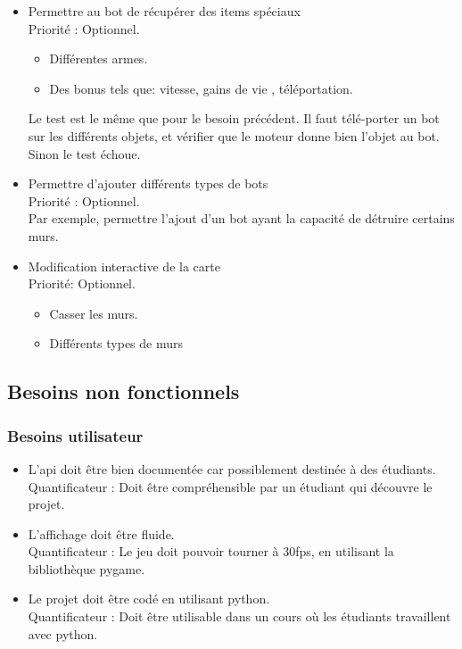 \documentclass[french]{article}
\begin{document}
\begin{itemize}
        \item Permettre au bot de récupérer des items spéciaux \\
            Priorité : Optionnel.
            \begin{itemize}
                \item Différentes armes.
                \item Des bonus tels que: vitesse, gains de vie , téléportation. \\
            \end{itemize}
            Le test est le même que pour le besoin précédent. Il faut télé-porter un bot sur les différents objets, et vérifier que le moteur donne bien l'objet au bot. Sinon le test échoue.\\
            
        \item Permettre d'ajouter différents types de bots \\
            Priorité : Optionnel. \\
            Par exemple, permettre l'ajout d'un bot ayant la capacité de détruire certains murs.\\
        
        \item Modification interactive de la carte \\
            Priorité: Optionnel.
             \begin{itemize}
                \item Casser les murs.
                \item Différents types de murs \\
            \end{itemize}
    \end{itemize}


\subsection{Besoins non fonctionnels}
\subsubsection{Besoins utilisateur}
    \begin{itemize}
        \item L'api doit être bien documentée car possiblement destinée à des étudiants.\\
            Quantificateur : Doit être compréhensible par un étudiant qui découvre le projet. \\

        \item L'affichage doit être fluide.\\
            Quantificateur : Le jeu doit pouvoir tourner à 30fps, en utilisant la bibliothèque pygame.\\

        \item Le projet doit être codé en utilisant python. \\
            Quantificateur : Doit être utilisable dans un cours où les étudiants travaillent avec python.\\

    \end{itemize}
\end{document}
